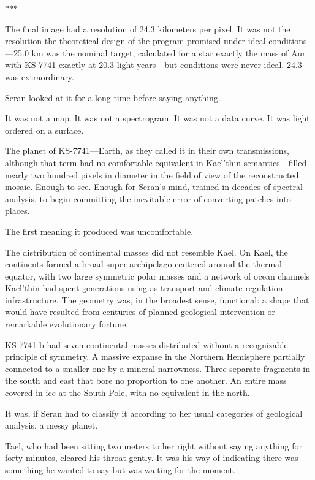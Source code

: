 \documentclass[11pt,a5paper,twoside]{book}
\begin{document}
\vspace{1.5em}
\begin{center}$\ast$\quad$\ast$\quad$\ast$\end{center}
\vspace{1.5em}

The final image had a resolution of 24.3 kilometers per pixel. It was not the resolution the theoretical design of the program promised under ideal conditions—25.0 km was the nominal target, calculated for a star exactly the mass of Aur with KS-7741 exactly at 20.3 light-years—but conditions were never ideal. 24.3 was extraordinary.

Seran looked at it for a long time before saying anything.

It was not a map. It was not a spectrogram. It was not a data curve. It was light ordered on a surface.

The planet of KS-7741—Earth, as they called it in their own transmissions, although that term had no comfortable equivalent in Kael'thin semantics—filled nearly two hundred pixels in diameter in the field of view of the reconstructed mosaic. Enough to see. Enough for Seran's mind, trained in decades of spectral analysis, to begin committing the inevitable error of converting patches into places.

The first meaning it produced was uncomfortable.

The distribution of continental masses did not resemble Kael. On Kael, the continents formed a broad super-archipelago centered around the thermal equator, with two large symmetric polar masses and a network of ocean channels Kael'thin had spent generations using as transport and climate regulation infrastructure. The geometry was, in the broadest sense, functional: a shape that would have resulted from centuries of planned geological intervention or remarkable evolutionary fortune.

KS-7741-b had seven continental masses distributed without a recognizable principle of symmetry. A massive expanse in the Northern Hemisphere partially connected to a smaller one by a mineral narrowness. Three separate fragments in the south and east that bore no proportion to one another. An entire mass covered in ice at the South Pole, with no equivalent in the north.

It was, if Seran had to classify it according to her usual categories of geological analysis, a messy planet.

Tael, who had been sitting two meters to her right without saying anything for forty minutes, cleared his throat gently. It was his way of indicating there was something he wanted to say but was waiting for the moment.
\end{document}
